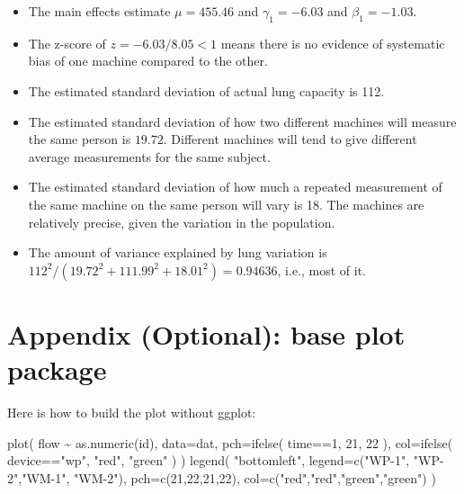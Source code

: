 \documentclass[
  letterpaper,
  DIV=11,
  numbers=noendperiod]{scrreprt}
\newenvironment{Shaded}{}{}
\newcommand{\AttributeTok}[1]{\textcolor[rgb]{0.49,0.56,0.16}{#1}}
\newcommand{\DecValTok}[1]{\textcolor[rgb]{0.25,0.63,0.44}{#1}}
\newcommand{\FunctionTok}[1]{\textcolor[rgb]{0.02,0.16,0.49}{#1}}
\newcommand{\NormalTok}[1]{#1}
\newcommand{\SpecialCharTok}[1]{\textcolor[rgb]{0.25,0.44,0.63}{#1}}
\newcommand{\StringTok}[1]{\textcolor[rgb]{0.25,0.44,0.63}{#1}}
\providecommand{\tightlist}{%
  \setlength{\itemsep}{0pt}\setlength{\parskip}{0pt}}\usepackage{longtable,booktabs,array}
\begin{document}
\begin{itemize}
\tightlist
\item
  The main effects estimate \(\mu = 455.46\) and \(\gamma_1 = -6.03\)
  and \(\beta_1 = -1.03\).
\item
  The z-score of \(z = -6.03 / 8.05 < 1\) means there is no evidence of
  systematic bias of one machine compared to the other.
\item
  The estimated standard deviation of actual lung capacity is 112.
\item
  The estimated standard deviation of how two different machines will
  measure the same person is \(19.72\). Different machines will tend to
  give different average measurements for the same subject.
\item
  The estimated standard deviation of how much a repeated measurement of
  the same machine on the same person will vary is 18. The machines are
  relatively precise, given the variation in the population.
\item
  The amount of variance explained by lung variation is
  \(112^2 / (19.72^2 + 111.99^2 + 18.01^2) = 0.94636\), i.e., most of
  it.
\end{itemize}

\section{Appendix (Optional): base plot
package}\label{appendix-optional-base-plot-package}

Here is how to build the plot without ggplot:

\begin{Shaded}
\begin{Highlighting}[]
\FunctionTok{plot}\NormalTok{( flow }\SpecialCharTok{\textasciitilde{}} \FunctionTok{as.numeric}\NormalTok{(id), }\AttributeTok{data=}\NormalTok{dat, }\AttributeTok{pch=}\FunctionTok{ifelse}\NormalTok{( time}\SpecialCharTok{==}\DecValTok{1}\NormalTok{, }\DecValTok{21}\NormalTok{, }\DecValTok{22}\NormalTok{ ),}
      \AttributeTok{col=}\FunctionTok{ifelse}\NormalTok{( device}\SpecialCharTok{==}\StringTok{"wp"}\NormalTok{, }\StringTok{"red"}\NormalTok{, }\StringTok{"green"}\NormalTok{ ) )}
\FunctionTok{legend}\NormalTok{( }\StringTok{"bottomleft"}\NormalTok{, }\AttributeTok{legend=}\FunctionTok{c}\NormalTok{(}\StringTok{"WP{-}1"}\NormalTok{, }\StringTok{"WP{-}2"}\NormalTok{,}\StringTok{"WM{-}1"}\NormalTok{, }\StringTok{"WM{-}2"}\NormalTok{),}
        \AttributeTok{pch=}\FunctionTok{c}\NormalTok{(}\DecValTok{21}\NormalTok{,}\DecValTok{22}\NormalTok{,}\DecValTok{21}\NormalTok{,}\DecValTok{22}\NormalTok{),}
        \AttributeTok{col=}\FunctionTok{c}\NormalTok{(}\StringTok{"red"}\NormalTok{,}\StringTok{"red"}\NormalTok{,}\StringTok{"green"}\NormalTok{,}\StringTok{"green"}\NormalTok{) )}
\end{Highlighting}
\end{Shaded}
\end{document}
